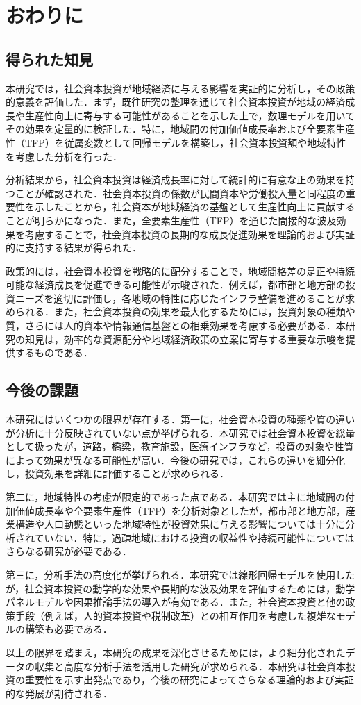 \chapter{おわりに}

\section{得られた知見}

本研究では，社会資本投資が地域経済に与える影響を実証的に分析し，その政策的意義を評価した．まず，既往研究の整理を通じて社会資本投資が地域の経済成長や生産性向上に寄与する可能性があることを示した上で，数理モデルを用いてその効果を定量的に検証した．特に，地域間の付加価値成長率および全要素生産性（TFP）を従属変数として回帰モデルを構築し，社会資本投資額や地域特性を考慮した分析を行った．

分析結果から，社会資本投資は経済成長率に対して統計的に有意な正の効果を持つことが確認された．社会資本投資の係数が民間資本や労働投入量と同程度の重要性を示したことから，社会資本が地域経済の基盤として生産性向上に貢献することが明らかになった．また，全要素生産性（TFP）を通じた間接的な波及効果を考慮することで，社会資本投資の長期的な成長促進効果を理論的および実証的に支持する結果が得られた．

政策的には，社会資本投資を戦略的に配分することで，地域間格差の是正や持続可能な経済成長を促進できる可能性が示唆された．例えば，都市部と地方部の投資ニーズを適切に評価し，各地域の特性に応じたインフラ整備を進めることが求められる．また，社会資本投資の効果を最大化するためには，投資対象の種類や質，さらには人的資本や情報通信基盤との相乗効果を考慮する必要がある．本研究の知見は，効率的な資源配分や地域経済政策の立案に寄与する重要な示唆を提供するものである．

\section{今後の課題}

本研究にはいくつかの限界が存在する．第一に，社会資本投資の種類や質の違いが分析に十分反映されていない点が挙げられる．本研究では社会資本投資を総量として扱ったが，道路，橋梁，教育施設，医療インフラなど，投資の対象や性質によって効果が異なる可能性が高い．今後の研究では，これらの違いを細分化し，投資効果を詳細に評価することが求められる．

第二に，地域特性の考慮が限定的であった点である．本研究では主に地域間の付加価値成長率や全要素生産性（TFP）を分析対象としたが，都市部と地方部，産業構造や人口動態といった地域特性が投資効果に与える影響については十分に分析されていない．特に，過疎地域における投資の収益性や持続可能性についてはさらなる研究が必要である．

第三に，分析手法の高度化が挙げられる．本研究では線形回帰モデルを使用したが，社会資本投資の動学的な効果や長期的な波及効果を評価するためには，動学パネルモデルや因果推論手法の導入が有効である．また，社会資本投資と他の政策手段（例えば，人的資本投資や税制改革）との相互作用を考慮した複雑なモデルの構築も必要である．

以上の限界を踏まえ，本研究の成果を深化させるためには，より細分化されたデータの収集と高度な分析手法を活用した研究が求められる．本研究は社会資本投資の重要性を示す出発点であり，今後の研究によってさらなる理論的および実証的な発展が期待される．
